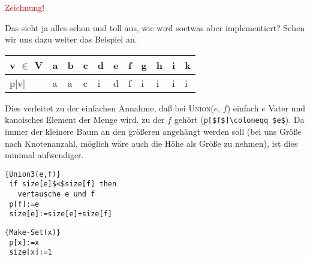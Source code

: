 \documentclass[ngerman,draft,parskip=half*,twoside]{scrreprt}
\theoremstyle{break}
\theoremstyle{nonumberbreak}
\begin{document}
\textcolor{red}{Zeichnung!}

Das sieht ja alles schon und toll aus, wie wird soetwas aber implementiert? Sehen wir uns dazu weiter das Beispiel an.

\begin{tabular}{l|llllllllll}
v $\in$ V & a & b & c & d & e & f & g & h & i & k\\
\hline
p[v] & a & a & c & i & d & f & i & i & i & i\\
\end{tabular}

Dies verleitet zu der einfachen Annahme, daß bei \textsc{Union}($e$, $f$) einfach $e$ Vater und kanoisches Element der
Menge wird, zu der $f$ gehört (\lstinline[mathescape=true]!p[$f$]\coloneqq $e$!). Da immer der kleinere Baum an den größeren
angehängt werden soll (bei uns Größe nach Knotenanzahl, möglich wäre auch die Höhe als Größe zu nehmen), ist
dies minimal aufwendiger.

\begin{Algorithmus}[H]
\begin{lstlisting}[frame=tlrb, mathescape=true, title=\textsc{Union\textnormal{(e, f)}},gobble=1]{Union3(e,f)}
 if size[e]$<$size[f] then
   vertausche e und f
 p[f]:=e
 size[e]:=size[e]+size[f]  
\end{lstlisting}
\end{Algorithmus} 

\begin{Algorithmus}[H]
\begin{lstlisting}[frame=tlrb, mathescape=true, title=\textsc{Make-Set\textnormal{(x)}},gobble=1]{Make-Set(x)}
 p[x]:=x
 size[x]:=1  
\end{lstlisting}
\end{Algorithmus} 
\end{document}
